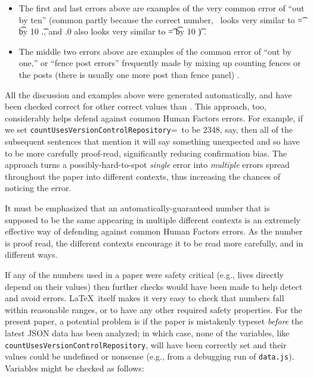 \documentclass[10pt,a4paper]{article}
\begin{document}
\begin{itemize}\raggedright
\item
The first and last errors above are examples of the very common error of ``out by ten'' (common partly because the correct number, \the\countUsesVersionControlRepository\ looks very similar to \t=\countUsesVersionControlRepository
\divide \t by 10
\the\t.\the\fraction, and \the\countUsesVersionControlRepository.0 also looks very similar to 
\t=\countUsesVersionControlRepository
\multiply \t by 10
\the\t) \cite{fixit}. 

\item
The middle two errors above are examples of the common error of ``out by one,'' or ``fence post errors'' frequently made by mixing up counting fences or the posts (there is usually one more post than fence panel) \cite{fixit}.
\end{itemize}

All the discussion and examples above were generated automatically, and have been checked correct for other correct values than \the\countUsesVersionControlRepository. This approach, too, considerably helps defend against common Human Factors errors. For example, if we set \texttt{\bslash countUsesVersionControlRepository}=\the\countUsesVersionControlRepository\ to be 2348, say, then all of the subsequent sentences that mention it will say something unexpected and so have to be more carefully proof-read, significantly reducing confirmation bias. The approach turns a possibly-hard-to-spot \emph{single\/} error into \emph{multiple\/} errors spread throughout the paper into different contexts, thus increasing the chances of noticing the error.

It must be emphasized that an automatically-guaranteed number that is supposed to be the same appearing in multiple different contexts is an extremely effective way of defending against common Human Factors errors. As the number is proof read, the different contexts encourage it to be read more carefully, and in different ways.

If any of the numbers used in a paper were safety critical (e.g., lives directly depend on their values) then further checks would have been made to help detect and avoid errors. \LaTeX\ itself makes it very easy to check that numbers fall within reasonable ranges, or to have any other required safety properties. For the present paper, a potential problem is if the paper is mistakenly typeset \emph{before\/} the latest JSON data has been analyzed; in which case, none of the variables, like \texttt{\bslash countUsesVersionControlRepository}, will have been correctly set and their values could be undefined or nonsense (e.g., from a debugging run of \texttt{data.js}). Variables might be checked as follows:
\end{document}
